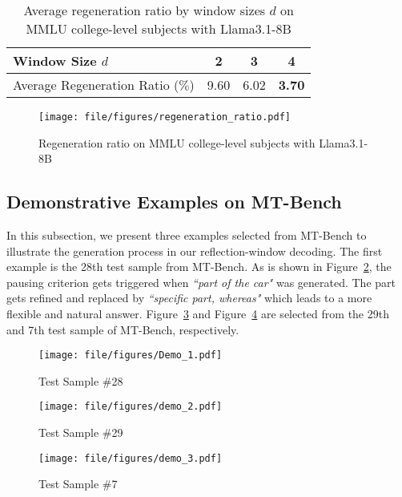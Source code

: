 \begin{table}[h]
    \centering
    \caption{Average regeneration ratio by window sizes $d$ on MMLU college-level subjects with Llama3.1-8B}
    \label{tab:regeneration_ratio}
    \begin{tabular}{lccc}
        \toprule
        Window Size $d$          & 2    & 3    & 4             \\
        \midrule
        Average Regeneration Ratio ($\%$) & 9.60 & 6.02 & \textbf{3.70} \\
        \bottomrule
    \end{tabular}
\end{table}
\begin{figure}[h]
    \centering
    \texttt{[image: file/figures/regeneration\_ratio.pdf]}
    \caption{Regeneration ratio on MMLU college-level subjects with Llama3.1-8B}
    \label{fig:regeneration_ratio}
\end{figure}


\newpage
\subsection{Demonstrative Examples on MT-Bench}
In this subsection, we present three examples selected from MT-Bench to illustrate the generation process in our reflection-window decoding.
The first example is the 28th test sample from MT-Bench.
As is shown in Figure~\ref{fig:demo1}, the pausing criterion gets triggered when \textit{``part of the car"} was generated.
The part gets refined and replaced by \textit{``specific part, whereas"} which leads to a more flexible and natural answer.
Figure~\ref{fig:demo2} and Figure~\ref{fig:demo3} are selected from the 29th and 7th test sample of MT-Bench, respectively.

\begin{figure}[h]
    \centering
    \texttt{[image: file/figures/Demo\_1.pdf]}  %
    \caption{Test Sample \#28}  %
    \label{fig:demo1}  %
\end{figure}
\begin{figure}[t]
    \centering
    \texttt{[image: file/figures/demo\_2.pdf]}  %
    \caption{Test Sample \#29}  %
    \label{fig:demo2}  %
\end{figure}
\begin{figure}[t]
    \centering
    \texttt{[image: file/figures/demo\_3.pdf]}  %
    \caption{Test Sample \#7}  %
    \label{fig:demo3}  %
\end{figure}
\color{black}